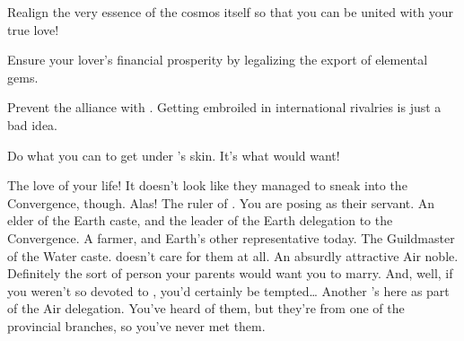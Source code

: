 \documentclass[char]{iron}
\begin{document}
\begin{itemz}[Goals]
\item Realign the very essence of the cosmos itself so that you can be united with your true love!
\item Ensure your lover's financial prosperity by legalizing the export of elemental gems.
\item Prevent the alliance with \sTreatyCountry{}.  Getting embroiled in
    international rivalries is just a bad idea.
\item Do what you can to get under \cGuildmaster{}'s skin. It's what \cGuildmaster{\real{\first}} would want!
\end{itemz}


\begin{contacts}
  \contact{\cGuildmaster{\real[\rs\MYplayer{}]{\bf{\intro}}}} The love of your life! It doesn't look like they managed to sneak into the Convergence, though. Alas!
  \contact{\cRoyalty{}} The ruler of \sHomeCountry{}. You are posing as their servant.
  \contact{\cSpy{}} An elder of the Earth caste, and the leader of the Earth delegation to the Convergence.
  \contact{\cPatriot{}} A farmer, and Earth's other representative today.
  \contact{\cGuildmaster{}} The Guildmaster of the Water caste. \cGuildmaster{\real{\first}} doesn't care for them at all.
  \contact{\cHotPerson{}} An absurdly attractive Air noble. Definitely the sort of person your parents would want you to marry. And, well, if you weren't so devoted to \cGuildmaster{\real{\first}}, you'd certainly be tempted\ldots{}
  \contact{\cBastard{}} Another \cBastard{\last}'s here
  as part of the Air delegation.  You've heard of them,
  but they're from one of the provincial branches, so you've never
  met them.
\end{contacts}
\end{document}
